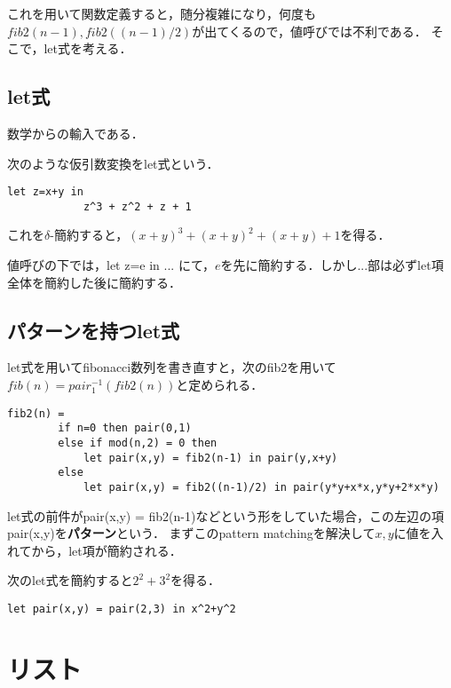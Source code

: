 \documentclass[uplatex, 12pt, dvipdfmx]{jsreport}
\begin{document}
これを用いて関数定義すると，随分複雑になり，何度も$fib2(n-1),fib2((n-1)/2)$が出てくるので，値呼びでは不利である．
そこで，let式を考える．

\subsection{let式}

数学からの輸入である．
\begin{definition}[let式]
    次のような仮引数変換をlet式という．
    \begin{lstlisting}[caption=let formula]
        let z=x+y in
            z^3 + z^2 + z + 1
    \end{lstlisting}
    これを$\delta$-簡約すると，$(x+y)^3+(x+y)^2+(x+y)+1$を得る．
\end{definition}
\begin{remark}
    値呼びの下では，let z=e in ... にて，$e$を先に簡約する．しかし...部は必ずlet項全体を簡約した後に簡約する．
\end{remark}

\subsection{パターンを持つlet式}

let式を用いてfibonacci数列を書き直すと，次のfib2を用いて$fib(n)=pair_1^{-1}(fib2(n))$と定められる．
\begin{lstlisting}[caption=fibonacci constructor]
    fib2(n) = 
        if n=0 then pair(0,1)
        else if mod(n,2) = 0 then
            let pair(x,y) = fib2(n-1) in pair(y,x+y)
        else
            let pair(x,y) = fib2((n-1)/2) in pair(y*y+x*x,y*y+2*x*y)
\end{lstlisting}

\begin{definition}[pattern]
    let式の前件がpair(x,y) = fib2(n-1)などという形をしていた場合，この左辺の項pair(x,y)を\textbf{パターン}という．
    まずこのpattern matchingを解決して$x,y$に値を入れてから，let項が簡約される．
\end{definition}
\begin{example}
    次のlet式を簡約すると$2^2+3^2$を得る．
    \begin{lstlisting}[caption=pattern matching]
        let pair(x,y) = pair(2,3) in x^2+y^2
    \end{lstlisting}
\end{example}

\section{リスト}
\end{document}
